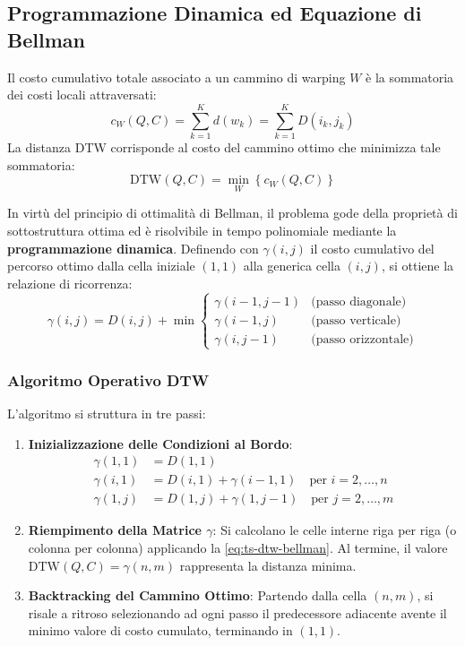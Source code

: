 \FloatBarrier
\subsection{Programmazione Dinamica ed Equazione di Bellman}
\label{subsec:ts-dtw-dynamic-programming}

Il costo cumulativo totale associato a un cammino di warping $W$ \`e la sommatoria dei costi locali attraversati:
\begin{equation}
c_W(Q, C) = \sum_{k=1}^K d(w_k) = \sum_{k=1}^K D(i_k, j_k)
\end{equation}
La distanza DTW corrisponde al costo del cammino ottimo che minimizza tale sommatoria:
\begin{equation}
\label{eq:ts-dtw-optimum}
\text{DTW}(Q, C) = \min_{W} \left\{ c_W(Q, C) \right\}
\end{equation}

In virt\`u del principio di ottimalit\`a di Bellman, il problema gode della propriet\`a di sottostruttura ottima ed \`e risolvibile in tempo polinomiale mediante la \textbf{programmazione dinamica}. Definendo con $\gamma(i, j)$ il costo cumulativo del percorso ottimo dalla cella iniziale $(1,1)$ alla generica cella $(i,j)$, si ottiene la relazione di ricorrenza:
\begin{equation}
\label{eq:ts-dtw-bellman}
\gamma(i, j) = D(i, j) + \min \begin{cases}
\gamma(i-1, j-1) & \text{(passo diagonale)} \\
\gamma(i-1, j)   & \text{(passo verticale)} \\
\gamma(i, j-1)   & \text{(passo orizzontale)}
\end{cases}
\end{equation}

\subsubsection{Algoritmo Operativo DTW}
L'algoritmo si struttura in tre passi:
\begin{enumerate}
    \item \textbf{Inizializzazione delle Condizioni al Bordo}:
    \begin{align}
    \gamma(1, 1) &= D(1, 1) \\
    \gamma(i, 1) &= D(i, 1) + \gamma(i-1, 1) \quad \text{per } i = 2, \dots, n \\
    \gamma(1, j) &= D(1, j) + \gamma(1, j-1) \quad \text{per } j = 2, \dots, m
    \end{align}
    \item \textbf{Riempimento della Matrice $\gamma$}:
    Si calcolano le celle interne riga per riga (o colonna per colonna) applicando la \autoref{eq:ts-dtw-bellman}. Al termine, il valore $\text{DTW}(Q, C) = \gamma(n, m)$ rappresenta la distanza minima.
    \item \textbf{Backtracking del Cammino Ottimo}:
    Partendo dalla cella $(n, m)$, si risale a ritroso selezionando ad ogni passo il predecessore adiacente avente il minimo valore di costo cumulato, terminando in $(1, 1)$.
\end{enumerate}

